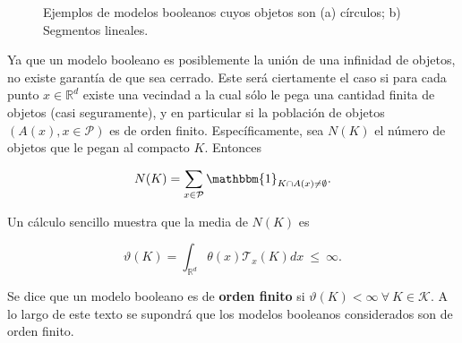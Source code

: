 \begin{figure}[H]
	\centering
{}
\qquad
\qquad
{}
\caption{Ejemplos de modelos booleanos cuyos objetos son (a) c\'irculos;
b) Segmentos lineales.}
\label{f:boolEx}
\end{figure}

Ya que un modelo booleano es posiblemente la uni\'on de una infinidad de objetos, no existe garant\'ia de que sea cerrado. Este ser\'a ciertamente el caso si para cada punto $x\in\mathbb{R}^d$ existe una vecindad a la cual s\'olo le pega una cantidad finita de objetos (casi seguramente), y en particular si la poblaci\'on de objetos $(A(x),x\in\mathcal{P})$ es de orden finito. Espec\'ificamente, sea $N(K)$ el n\'umero de objetos que le pegan al compacto $K$. Entonces

\[N(K)=\sum_{x\in\mathcal{P}}\mathbbm{1}_{K\cap A(x)\neq\emptyset}.\]

Un c\'alculo sencillo muestra que la media de $N(K)$ es

\[\vartheta(K)=\int_{\mathbb{R}^d}\theta(x)\mathcal{T}_x(K)dx\ \leq\ \infty.\]

Se dice que un modelo booleano es de \textbf{orden finito} si $\vartheta(K)<\infty\ \forall\ K\in\mathcal{K}$. A lo largo de este texto se supondr\'a que los modelos booleanos considerados son de orden finito.

